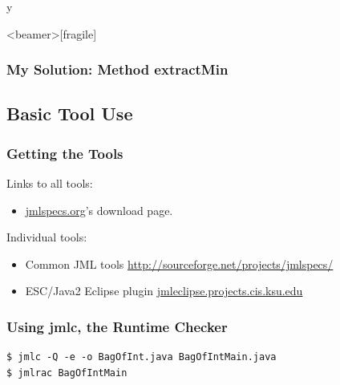 \if y\MAKEHANDOUTS \documentclass[compress,landscape,handout]{beamer}
\begin{document}
\begin{frame}<beamer>[fragile]
\frametitle{My Solution: Method extractMin}


\end{frame}


\subsection[Tool Use]{Basic Tool Use}  %

\begin{frame}
\frametitle{Getting the Tools}

Links to all tools:
\begin{itemize}
\item
\href{http://www.jmlspecs.org/}{jmlspecs.org}'s download page.
\end{itemize}


Individual tools:
\begin{itemize}
\item
Common JML tools
\href{http://sourceforge.net/projects/jmlspecs/}{http://sourceforge.net/projects/jmlspecs/}

\item
ESC/Java2 Eclipse plugin \newline
\href{http://jmleclipse.projects.cis.ksu.edu}{jmleclipse.projects.cis.ksu.edu}
\end{itemize}
\end{frame}

\begin{frame}[fragile]
\frametitle{Using jmlc, the Runtime Checker}

\begin{example}
\begin{verbatim}
$ jmlc -Q -e -o BagOfInt.java BagOfIntMain.java
$ jmlrac BagOfIntMain
\end{verbatim}
\end{example}
\end{frame}
\end{document}
